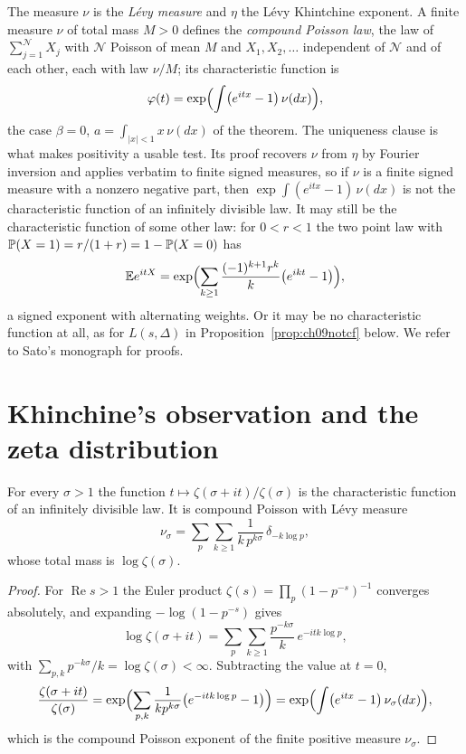 The measure $\nu$ is the \emph{L\'evy measure} and $\eta$ the L\'evy Khintchine exponent. A finite measure $\nu$ of total mass $M>0$ defines the \emph{compound Poisson law}, the law of $\sum_{j=1}^{\mathcal N} X_j$ with $\mathcal N$ Poisson of mean $M$ and $X_1,X_2,\dots$ independent of $\mathcal N$ and of each other, each with law $\nu/M$; its characteristic function is
\[
\varphi(t) = \exp\Bigl(\int \bigl(e^{itx}-1\bigr)\,\nu(dx)\Bigr),
\]
the case $\beta=0$, $a=\int_{|x|<1}x\,\nu(dx)$ of the theorem. The uniqueness clause is what makes positivity a usable test. Its proof recovers $\nu$ from $\eta$ by Fourier inversion and applies verbatim to finite signed measures, so if $\nu$ is a finite signed measure with a nonzero negative part, then $\exp\int(e^{itx}-1)\,\nu(dx)$ is not the characteristic function of an infinitely divisible law. It may still be the characteristic function of some other law: for $0<r<1$ the two point law with $\mathbb{P}(X=1) = r/(1+r) = 1-\mathbb{P}(X=0)$ has
\[
\mathbb{E} e^{itX} = \exp\Bigl(\sum_{k\ge1}\frac{(-1)^{k+1}r^k}{k}\bigl(e^{ikt}-1\bigr)\Bigr),
\]
a signed exponent with alternating weights. Or it may be no characteristic function at all, as for $L(s,\Delta)$ in Proposition~\ref{prop:ch09notcf} below. We refer to Sato's monograph \cite{sato1999} for proofs.

\section{Khinchine's observation and the zeta distribution}

\begin{theorem}\label{thm:ch09khinchine}
For every $\sigma > 1$ the function $t \mapsto \zeta(\sigma+it)/\zeta(\sigma)$ is the characteristic function of an infinitely divisible law. It is compound Poisson with L\'evy measure
\[
\nu_\sigma = \sum_{p}\sum_{k\ge 1} \frac{1}{k\,p^{k\sigma}}\,\delta_{-k\log p},
\]
whose total mass is $\log \zeta(\sigma)$.
\end{theorem}

\begin{proof}
For $\operatorname{Re} s > 1$ the Euler product $\zeta(s) = \prod_p (1-p^{-s})^{-1}$ converges absolutely, and expanding $-\log(1-p^{-s})$ gives
\[
\log \zeta(\sigma+it) = \sum_p \sum_{k\ge 1} \frac{p^{-k\sigma}}{k}\, e^{-itk\log p},
\]
with $\sum_{p,k} p^{-k\sigma}/k = \log\zeta(\sigma) < \infty$. Subtracting the value at $t=0$,
\[
\frac{\zeta(\sigma+it)}{\zeta(\sigma)} = \exp\Bigl(\sum_{p,k} \frac{1}{k p^{k\sigma}}\bigl(e^{-itk\log p} - 1\bigr)\Bigr)
= \exp\Bigl(\int \bigl(e^{itx}-1\bigr)\,\nu_\sigma(dx)\Bigr),
\]
which is the compound Poisson exponent of the finite positive measure $\nu_\sigma$.
\end{proof}

